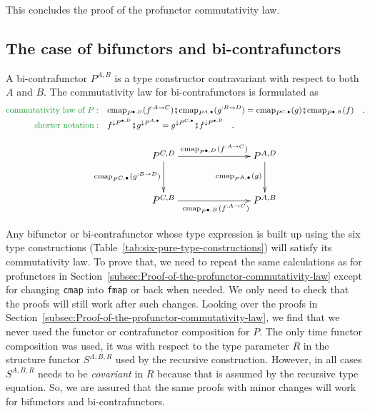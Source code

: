 This concludes the proof of the profunctor commutativity law.

\subsection{The case of bifunctors and bi-contrafunctors\label{subsec:Proofs-of-commutativity-for-bifunctor}}

A bi-contrafunctor $P^{A,B}$ is a type constructor contravariant
with respect to both $A$ and $B$. The commutativity law for bi-contrafunctors
is formulated as 
\begin{align}
{\color{greenunder}\text{commutativity law of }P:}\quad & \text{cmap}_{P^{\bullet,D}}(f^{:A\rightarrow C})\bef\text{cmap}_{P^{A,\bullet}}(g^{:B\rightarrow D})=\text{cmap}_{P^{C,\bullet}}(g)\bef\text{cmap}_{P^{\bullet,B}}(f)\quad.\nonumber \\
{\color{greenunder}\text{shorter notation}:}\quad & f^{\downarrow P^{\bullet,D}}\bef g^{\downarrow P^{A,\bullet}}=g^{\downarrow P^{C,\bullet}}\bef f^{\downarrow P^{\bullet,B}}\quad.\label{eq:bi-contrafunctor-commutativity-law}
\end{align}

\begin{wrapfigure}{l}{0.43\columnwidth}%
\vspace{-1.7\baselineskip}
\[
\xymatrix{\xyScaleY{2.5pc}\xyScaleX{6.0pc}P^{C,D}\ar[r]\sp(0.55){\text{cmap}_{P^{\bullet,D}}(f^{:A\rightarrow C})~~~}\ar[d]\sb(0.45){\text{cmap}_{P^{C,\bullet}}(g^{:B\rightarrow D})} & P^{A,D}\ar[d]\sb(0.45){\text{cmap}_{P^{A,\bullet}}(g)}\\
P^{C,B}\ar[r]\sb(0.45){~~~~\text{cmap}_{P^{\bullet,B}}(f^{:A\rightarrow C})} & P^{A,B}
}
\]

\vspace{-1.7\baselineskip}
\end{wrapfigure}%

Any bifunctor or bi-contrafunctor whose type expression is built up
using the six type constructions (Table~\ref{tab:six-pure-type-constructions})
will satisfy its commutativity law. To prove that, we need to repeat
the same calculations as for profunctors in Section~\ref{subsec:Proof-of-the-profunctor-commutativity-law}
except for changing \lstinline!cmap! into \lstinline!fmap! or back
when needed. We only need to check that the proofs will still work
after such changes. Looking over the proofs in Section~\ref{subsec:Proof-of-the-profunctor-commutativity-law},
we find that we never used the functor or contrafunctor composition
for $P$. The only time functor composition was used, it was with
respect to the type parameter $R$ in the structure functor $S^{A,B,R}$
used by the recursive construction. However, in all cases $S^{A,B,R}$
needs to be \emph{covariant} in $R$ because that is assumed by the
recursive type equation. So, we are assured that the same proofs with
minor changes will work for bifunctors and bi-contrafunctors.


